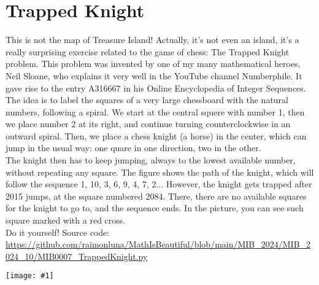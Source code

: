 \documentclass[12pt,landscape]{article}
\newcommand{\artpage}[3][]{%
  \begin{minipage}[t]{0.48\linewidth}
    \vspace{0pt} %
    \section*{#2} %
    \addcontentsline{toc}{section}{#2} %
    #3 %
  \end{minipage}%
  \hfill
  \begin{minipage}[t]{0.48\linewidth}
    \vspace{0pt} %
    \centering
    \texttt{[image: \#1]}
  \end{minipage}%
  \newpage
}
\begin{document}
\artpage[../Output/LowQuality/MIB0007_TrappedKnight.png]{Trapped Knight}{%
This is not the map of Treasure Island! Actually, it's not even an island, it's a really surprising exercise related to the game of chess: The Trapped Knight problem. This problem was invented by one of my many mathematical heroes, Neil Sloane, who explains it very well in the YouTube channel Numberphile. It gave rise to the entry A316667 in his Online Encyclopedia of Integer Sequences.\\

The idea is to label the squares of a very large chessboard with the natural numbers, following a spiral. We start at the central squere with number 1, then we place number 2 at its right, and continue turning counterclockwise in an outward spiral. Then, we place a chess knight (a horse) in the center, which can jump in the usual way: one quare in one direction, two in the other.\\

The knight then has to keep jumping, always to the lowest available number, without repeating any square. The figure shows the path of the knight, which will follow the sequence 1, 10, 3, 6, 9, 4, 7, 2... However, the knight gets trapped after 2015 jumps, at the square numbered 2084. There, there are no available squares for the knight to go to, and the sequence ends. In the picture, you can see such square marked with a red cross.\\

Do it yourself! Source code: \url{https://github.com/raimonluna/MathIsBeautiful/blob/main/MIB_2024/MIB_2024_10/MIB0007_TrappedKnight.py}
}
\end{document}
